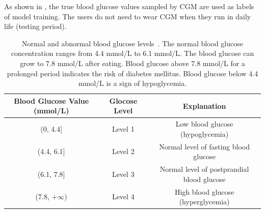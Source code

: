 As shown in , the true blood glucose values sampled by CGM are used as labels of model training. The users do not need to wear CGM when they run \sysname in daily life (\ie testing period).  


\begin{table}[h]
  \centering
  \caption{Normal and abnormal blood glucose levels~\cite{bib:BGWiKi}. The normal blood glucose concentration ranges from 4.4 mmol/L to 6.1 mmol/L. The blood glucose can grow to 7.8 mmol/L after eating. Blood glucose above 7.8 mmol/L for a prolonged period indicates the risk of diabetes mellitus. Blood glucose below 4.4 mmol/L is a sign of hypoglycemia.}
  \label{tab:blood_glucose_levels}
  \begin{tabular}{|c|c|c|}
  \hline
  \textbf{Blood Glucose Value (mmol/L)} & \textbf{Glocose Level} & \textbf{Explanation}                      \\ \hline
  (0, 4.4{]}                            & Level 1                & Low blood glucose (hypoglycemia)         \\ \hline
  (4.4, 6.1{]}                          & Level 2                & Normal level of fasting blood glucose      \\ \hline
  (6.1, 7.8{]}                          & Level 3                & Normal level of postprandial blood glucose \\ \hline
  (7.8, $+\infty$)                      & Level 4                & High blood glucose (hyperglycemia)          \\ \hline
  \end{tabular}
\end{table}





